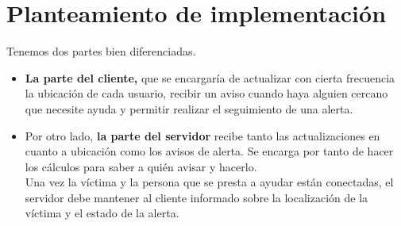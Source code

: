 \section{Planteamiento de implementación}

Tenemos dos partes bien diferenciadas.
\begin{itemize}
	\item  \textbf{La parte del cliente,} que se encargaría de actualizar con cierta frecuencia
la ubicación de cada usuario, recibir un aviso cuando haya alguien cercano que necesite ayuda y permitir realizar el seguimiento de una alerta.
\item Por otro lado, \textbf{la parte del servidor} recibe tanto las actualizaciones en cuanto a ubicación como 
los avisos de alerta. Se encarga por tanto de hacer los cálculos para saber a quién avisar y hacerlo. \\
Una vez la víctima y la persona que se presta a ayudar están conectadas, el servidor debe mantener
al cliente informado sobre la localización de la víctima y el estado de la alerta.
\end{itemize}


